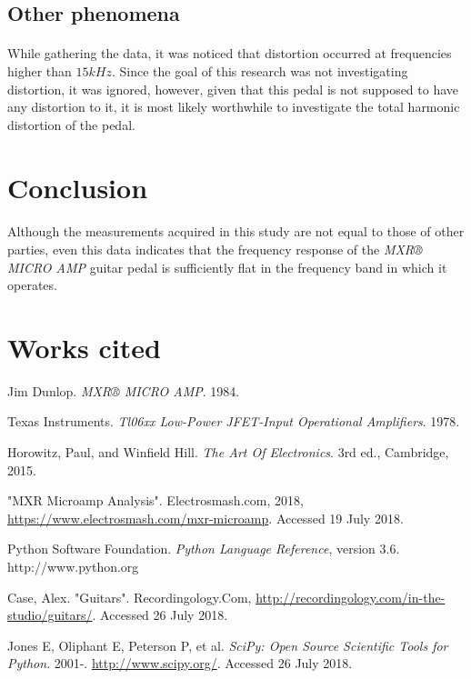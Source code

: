 \documentclass[a4paper, 12pt]{article}
\begin{document}
\subsection{Other phenomena}
\paragraph*{}
While gathering the data, it was noticed that distortion occurred at 
frequencies higher than $15\si{kHz}$. Since the goal of this research was not 
investigating distortion, it was ignored, however, given that this pedal is 
not supposed to have any distortion to it, it is most likely worthwhile to 
investigate the total harmonic distortion of the pedal.

\section{Conclusion}
\paragraph*{}
Although the measurements acquired in this study are not equal to those 
of other parties, even this data indicates that the frequency response of 
the \textit{MXR® MICRO AMP} guitar pedal is sufficiently flat in the frequency 
band in which it operates.

\newpage
\section*{Works cited}
\begin{hangparas}{.25in}{1}
	Jim Dunlop. \textit{MXR® MICRO AMP}. 1984.

	Texas Instruments. \textit{Tl06xx Low-Power JFET-Input Operational 
	Amplifiers}. 1978.

	Horowitz, Paul, and Winfield Hill. \textit{The Art Of Electronics}. 3rd ed., 
	Cambridge, 2015.

	"MXR Microamp Analysis". Electrosmash.com, 2018, 
	\url{https://www.electrosmash.com/mxr-microamp}. Accessed 19 July 2018.

	Python Software Foundation. \textit{Python Language Reference}, version 
	3.6. http://www.python.org

	Case, Alex. "Guitars". Recordingology.Com, 
	\url{http://recordingology.com/in-the-studio/guitars/}. 
	Accessed 26 July 2018.

	Jones E, Oliphant E, Peterson P, et al. \textit{SciPy: Open Source 
	Scientific Tools for Python}. 2001-. \url{http://www.scipy.org/}. 
	Accessed 26 July 2018.
\end{hangparas}
\end{document}
